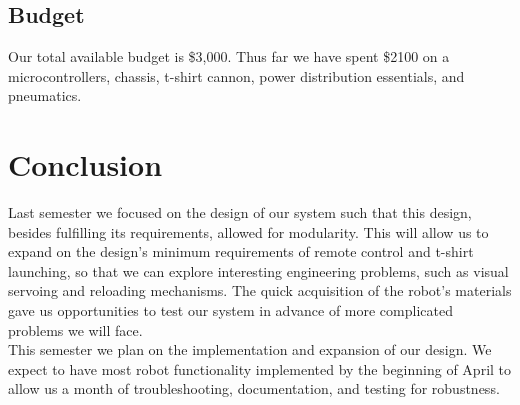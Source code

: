 \documentclass[letterpaper,12pt]{article}
\begin{document}
\subsection{Budget}
Our total available budget is \$3,000. Thus far we have spent \$2100 on a microcontrollers,
chassis, t-shirt cannon, power distribution essentials, and pneumatics.
\section{Conclusion}
Last semester we focused on the design of our system such that this design, besides fulfilling its requirements, allowed for modularity. This will allow us to expand on the design's minimum requirements of remote control and t-shirt launching, so that we can explore interesting engineering problems, such as visual servoing and reloading mechanisms. The quick acquisition of the robot's materials gave us opportunities to test our system in advance of more complicated problems we will face.\\

This semester we plan on the implementation and expansion of our design. We expect to have most robot functionality implemented by the beginning of April to allow us a month of troubleshooting, documentation, and testing for robustness. 
\end{document}
